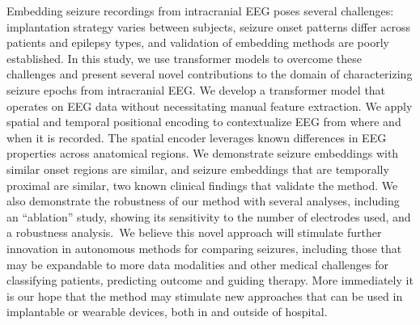 \documentclass[11pt]{article}
\begin{document}
Embedding seizure recordings from intracranial EEG poses several challenges: implantation strategy varies between subjects, seizure onset patterns differ across patients and epilepsy types, and validation of embedding methods are poorly established. In this study, we use transformer models to overcome these challenges and present several novel contributions to the domain of characterizing seizure epochs from intracranial EEG. We develop a transformer model that operates on EEG data without necessitating manual feature extraction. We apply spatial and temporal positional encoding to contextualize EEG from where and when it is recorded. The spatial encoder leverages known differences in EEG properties across anatomical regions\cite{Bernabei2022Normative,Frauscher2018Atlas,Taylor2022Normative}. We demonstrate seizure embeddings with similar onset regions are similar, and seizure embeddings that are temporally proximal are similar, two known clinical findings that validate the method. We also demonstrate the robustness of our method with several analyses, including an “ablation” study, showing its sensitivity to the number of electrodes used, and a robustness analysis. We believe this novel approach will stimulate further innovation in autonomous methods for comparing seizures, including those that may be expandable to more data modalities and other medical challenges for classifying patients, predicting outcome and guiding therapy. More immediately it is our hope that the method may stimulate new approaches that can be used in implantable or wearable devices, both in and outside of hospital. 
\end{document}
